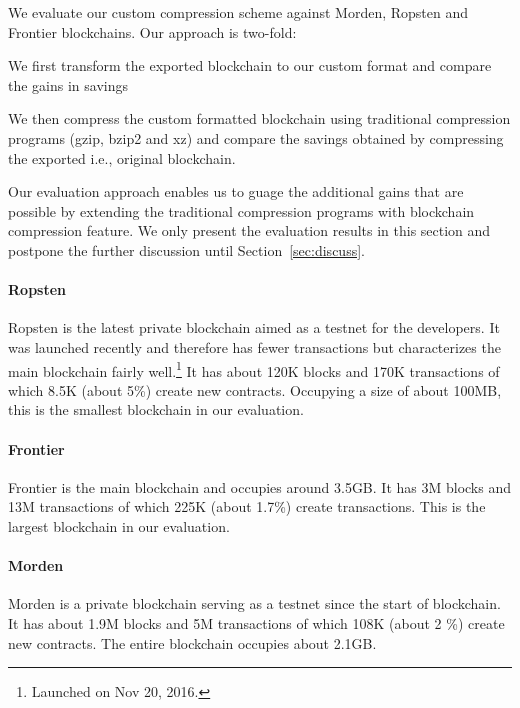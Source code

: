 
We evaluate our custom compression scheme against Morden, Ropsten and Frontier blockchains.
Our approach is two-fold:
\begin{enumerate*}
	\item We first transform the exported blockchain to our custom format and compare the gains in savings
	\item We then compress the custom formatted blockchain using traditional compression programs (gzip, bzip2 and xz) and compare the savings obtained by compressing the exported i.e., original blockchain.
\end{enumerate*}
Our evaluation approach enables us to guage the additional gains that are possible by extending the traditional compression programs with blockchain compression feature. 
We only present the evaluation results in this section and 
postpone the further discussion until Section~\ref{sec:discuss}. 

\paragraph{Ropsten}
Ropsten is the latest private blockchain aimed as a testnet for the \eth{} developers. It was launched recently and therefore has fewer transactions but characterizes the main blockchain fairly well.\footnote{Launched on Nov 20, 2016.}
It has about 120K blocks and 170K transactions of which 8.5K (about 5\%) create new contracts.
Occupying a size of about 100MB, this is the smallest blockchain in our evaluation. 
\paragraph{Frontier}
Frontier is the main \eth{} blockchain and occupies around 3.5GB. It has 3M blocks and 13M transactions of which 225K (about 1.7\%) create transactions. 
This is the largest blockchain in our evaluation.

\paragraph{Morden}
Morden is a private blockchain serving as a testnet since the start of \eth{} blockchain. 
It has about 1.9M blocks and 5M transactions of which 108K (about 2 \%) create new contracts. The entire blockchain occupies about 2.1GB.

